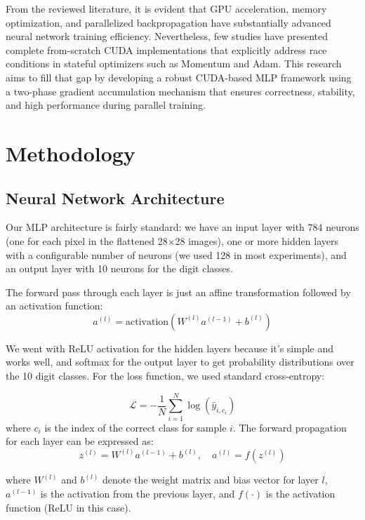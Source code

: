 \documentclass[conference]{IEEEtran}
\begin{document}
From the reviewed literature, it is evident that GPU acceleration, memory optimization, and parallelized backpropagation have substantially advanced neural network training efficiency. Nevertheless, few studies have presented complete from-scratch CUDA implementations that explicitly address race conditions in stateful optimizers such as Momentum and Adam. This research aims to fill that gap by developing a robust CUDA-based MLP framework using a two-phase gradient accumulation mechanism that ensures correctness, stability, and high performance during parallel training.

\section{Methodology}

\subsection{Neural Network Architecture}

Our MLP architecture is fairly standard: we have an input layer with 784 neurons (one for each pixel in the flattened 28×28 images), one or more hidden layers with a configurable number of neurons (we used 128 in most experiments), and an output layer with 10 neurons for the digit classes.

The forward pass through each layer is just an affine transformation followed by an activation function:
\begin{equation}
a^{(l)} = \text{activation}(W^{(l)} a^{(l-1)} + b^{(l)})
\end{equation}

We went with ReLU activation for the hidden layers because it's simple and works well, and softmax for the output layer to get probability distributions over the 10 digit classes. For the loss function, we used standard cross-entropy:

\begin{equation}
\mathcal{L} = -\frac{1}{N} \sum_{i=1}^{N} \log(\hat{y}_{i,c_i})
\end{equation}
where $c_i$ is the index of the correct class for sample $i$.
The forward propagation for each layer can be expressed as:
\begin{equation}
z^{(l)} = W^{(l)} a^{(l-1)} + b^{(l)}, \quad a^{(l)} = f(z^{(l)})
\end{equation}

where $W^{(l)}$ and $b^{(l)}$ denote the weight matrix and bias vector for layer $l$, $a^{(l-1)}$ is the activation from the previous layer, and $f(\cdot)$ is the activation function (ReLU in this case).
\end{document}
